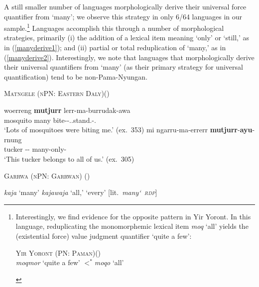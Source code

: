 \documentclass[12pt,egregdoesnotlikesansseriftitles]{scrartcl}
\begin{document}
 A still smaller number of languages morphologically derive their universal force quantifier from `many'; we observe this strategy in only 6/64 languages in our sample.\footnote{Interestingly, we find evidence for the opposite pattern in  Yir Yoront. In this language, reduplicating the monomorphemic lexical item \textit{moq} `all' yields the (existential force) value judgment quantifier `quite a few':
\vspace{-2mm}
\begin{exe}
  \ex \textsc{Yir Yoront (PN: Paman)}\hfill (\citealt[375]{alpher73})\\
  \textit{\charis moqmor} `quite a few' $<^*$\textit{\charis moqo} `all'
\end{exe}}  Languages accomplish this  through a number of morphological strategies, primarily (i) the addition of a lexical item meaning `only' or `still,' as in (\ref{manyderive1});  and (ii) partial or total reduplication of `many,' as in (\ref{manyderive2}). Interestingly, we note that languages that morphologically derive their universal quantifiers from `many' (as their primary strategy for universal quantification) tend to be non-Pama-Nyungan.

\begin{exe}
  \ex \textsc{Matngele (nPN: Eastern Daly)}\hfill (\citealt{zandvoort99}) \label{manyderive1}
  \begin{xlist}
    \ex \gll woerreng \textbf{mutjurr} lerr-ma-burrudak-awa\\
    mosquito many bite-\Impf-\Third\Aug.\Sarg.stand.\Pst-\First\Min.\Obj\\
    \glt `Lots of mosquitoes were biting me.' (ex.~353) %
    \ex \gll mi ngarru-ma-errerr \textbf{mutjurr}-\textbf{ayu}-rnung\\
    tucker \First\Aug-\Prm-\Incl{} many-only-\Purp\\
    \glt `This tucker belongs to all of us.' (ex.~305)
    \end{xlist}
\ex \textsc{Garrwa (nPN: Garrwan)} \hfill(\citealt[54]{mushin12}) \label{manyderive2}
  \begin{xlist}
    \ex \textit{kaja} `many'
    \ex \textit{kajawaja}  `all,' `every' [lit.\ \textit{many\char`~\textsc{rdp}}]
  \end{xlist}
\end{exe}
\end{document}
